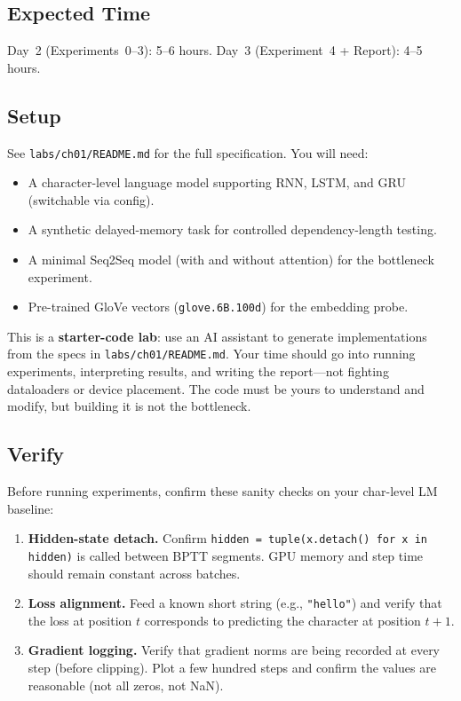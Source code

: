 \subsection*{Expected Time}

Day~2 (Experiments~0--3): 5--6 hours. Day~3 (Experiment~4 + Report): 4--5 hours.

\subsection*{Setup}

See \texttt{labs/ch01/README.md} for the full specification. You will need:
\begin{itemize}[nosep]
    \item A character-level language model supporting RNN, LSTM, and GRU (switchable via config).
    \item A synthetic delayed-memory task for controlled dependency-length testing.
    \item A minimal Seq2Seq model (with and without attention) for the bottleneck experiment.
    \item Pre-trained GloVe vectors (\texttt{glove.6B.100d}) for the embedding probe.
\end{itemize}
This is a \textbf{starter-code lab}: use an AI assistant to generate implementations from the specs in \texttt{labs/ch01/README.md}. Your time should go into running experiments, interpreting results, and writing the report---not fighting dataloaders or device placement. The code must be yours to understand and modify, but building it is not the bottleneck.

\subsection*{Verify}

Before running experiments, confirm these sanity checks on your char-level LM baseline:
\begin{enumerate}[nosep]
    \item \textbf{Hidden-state detach.} Confirm \texttt{hidden = tuple(x.detach() for x in hidden)} is called between BPTT segments. GPU memory and step time should remain constant across batches.
    \item \textbf{Loss alignment.} Feed a known short string (e.g., \texttt{"hello"}) and verify that the loss at position $t$ corresponds to predicting the character at position $t+1$.
    \item \textbf{Gradient logging.} Verify that gradient norms are being recorded at every step (before clipping). Plot a few hundred steps and confirm the values are reasonable (not all zeros, not NaN).
\end{enumerate}

